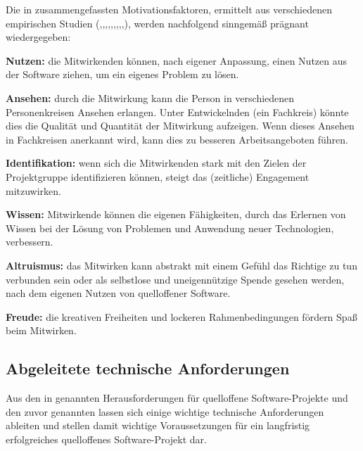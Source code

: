 Die in  zusammengefassten Motivationsfaktoren, ermittelt aus verschiedenen empirischen Studien (,,,,,,,,,), werden nachfolgend sinngemäß prägnant wiedergegeben:
\begin{inparaenum}[\bfseries(a)]
    \item \textbf{Nutzen:} die Mitwirkenden können, \insb nach eigener Anpassung, einen Nutzen aus der Software ziehen, um \zB ein eigenes Problem zu lösen.
    \item \textbf{Ansehen:} durch die Mitwirkung kann die Person in verschiedenen Personenkreisen Ansehen erlangen.
    Unter Entwickelnden (ein Fachkreis) könnte dies \zB die Qualität und Quantität der Mitwirkung aufzeigen.
    Wenn dieses Ansehen in Fachkreisen anerkannt wird, kann dies \zB zu besseren Arbeitsangeboten führen.
    \item \textbf{Identifikation:} wenn sich die Mitwirkenden stark mit den Zielen der Projektgruppe identifizieren können, steigt das (zeitliche) Engagement mitzuwirken.
    \item \textbf{Wissen:} Mitwirkende können die eigenen Fähigkeiten, durch das Erlernen von Wissen bei der Lösung von Problemen und Anwendung neuer Technologien, verbessern.
    \item \textbf{Altruismus:} das Mitwirken kann abstrakt mit einem Gefühl das Richtige zu tun verbunden sein oder als selbstlose und uneigennützige Spende gesehen werden, \ggf nach dem eigenen Nutzen von quelloffener Software.
    \item\label{itm:MF.Freude} \textbf{Freude:} die kreativen Freiheiten und lockeren Rahmenbedingungen fördern Spaß beim Mitwirken.
\end{inparaenum}


\subsection{Abgeleitete technische Anforderungen}\label{subsec:abgeleitete-technische-anforderungen}

Aus den in  genannten Herausforderungen für quelloffene Software-Projekte und den zuvor genannten  lassen sich einige wichtige technische Anforderungen ableiten und stellen damit wichtige Voraussetzungen für ein langfristig erfolgreiches quelloffenes Software-Projekt dar.

